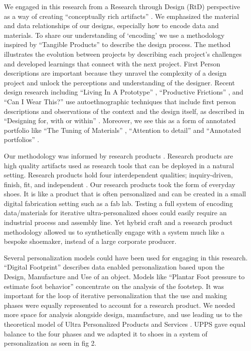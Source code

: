 We engaged in this research from a Research through Design (RtD) perspective as a way of creating ``conceptually rich artifacts'' \cite{Gaver2012a}. We emphasized the material and data relationships of our designs, especially how to encode data and materials. To share our understanding of `encoding' we use a methodology inspired by ``Tangible Products'' \cite{Djajadiningrat2004} to describe the design process. The method illustrates the evolution between projects by describing each project's challenges and developed learnings that connect with the next project. First Person descriptions are important because they unravel the complexity of a design project and unlock the perceptions and understanding of the designer. Recent design research including ``Living In A Prototype'' \cite{Desjardins2016}, ``Productive Frictions'' \cite{Wakkary2016}, and ``Can I Wear This?'' \cite{mackey2017can} use autoethnographic techniques that include first person descriptions and observations of the context and the design itself, as described in ``Designing for, with or within'' \cite{Tomico2012}. Moreover, we see this as a form of annotated portfolio like ``The Tuning of Materials'' \cite{Karana2016}, ``Attention to detail'' \cite{Jarvis2012} and ``Annotated portfolios'' \cite{Gaver2012}.

Our methodology was informed by research products \cite{Odom2016}. Research products are high quality artifacts used as research tools that can be deployed in a natural setting. Research products hold four interdependent qualities; inquiry-driven, finish, fit, and independent \cite{Odom2016}. Our research products took the form of everyday shoes. It is like a product that is often personalized and can be created in a small digital fabrication setting such as a fab lab. Testing a full system of encoding data/materials for iterative ultra-personalized shoes could easily require an industrial process and assembly line. Yet hybrid craft and a research product methodology allowed us to synthetically engage with a system much like a bespoke shoemaker, instead of a large corporate producer.

Several personalization models could have been used for engaging in this research. ``Digital Footprint'' \cite{Benford2015} describes data enabled personalization based upon the Design, Manufacture and Use of an object. Models like ``Plantar Foot pressure to estimate foot behavior'' \cite{Hagman2005} concentrate on the analysis of the footstep. It was important for the loop of iterative personalization that the use and making phases were equally represented to account for a research product. We needed more space for analysis alongside design, manufacture, and use leading us to the theoretical model of Ultra Personalized Products and Services \cite{stolwijk2018going}. UPPS gave equal balance to the four phases and we adapted it to shoes in a system of personalization as seen in fig 2. 


